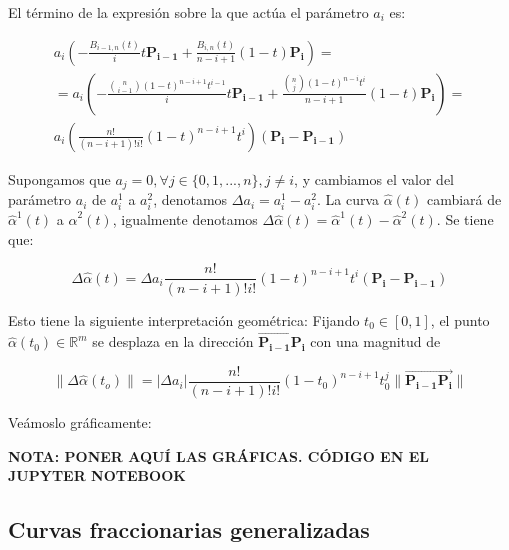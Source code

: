 \documentclass{article}
\newcommand{\R}{\mathbb{R}}
\begin{document}
El término de la expresión sobre la que actúa el parámetro $a_i$ es:

\begin{gather*}
a_i \left( -\frac{B_{i-1,n}(t)}{i} t \mathbf{P_{i-1}} + \frac{B_{i,n}(t)}{n-i+1} (1-t) \mathbf{P_i} \right) = \\
= a_i \left( -\frac{\binom{n}{i-1}(1-t)^{n-i+1} t^{i-1}}{i} t \mathbf{P_{i-1}} + \frac{\binom{n}{j}(1-t)^{n-i}t^i}{n-i+1} (1-t) \mathbf{P_i} \right) = \\
a_i \left( \frac{n!}{(n-i+1)!i!} (1-t)^{n-i+1} t^i  \right) \left( \mathbf{P_i} - \mathbf{P_{i-1}} \right)
\end{gather*}

Supongamos que $a_j = 0, \forall j\in\{0,1,...,n\}, j \neq i $, y cambiamos el valor del parámetro $a_i$ de $a_i^1$ a $a_i^2$, denotamos $\Delta a_i = a_i^1 - a_i^2$. La curva $\hat{\alpha}(t)$ cambiará de $\hat{\alpha}^1(t)$ a $\hat{\alpha}^2(t)$, igualmente denotamos $\Delta \hat{\alpha}(t) = \hat{\alpha}^1(t) - \hat{\alpha}^2(t)$. Se tiene que:

\begin{equation*}
\Delta \hat{\alpha}(t) = \Delta a_i \frac{n!}{(n-i+1)!i!}(1-t)^{n-i+1}t^i \left( \mathbf{P_i} - \mathbf{P_{i-1}} \right)
\end{equation*}

Esto tiene la siguiente interpretación geométrica: Fijando $t_0 \in [0,1]$, el punto $\hat{\alpha}(t_0) \in \R^m$ se desplaza en la dirección $\overrightarrow{\mathbf{P_{i-1}P_i}}$ con una magnitud de

\begin{equation*}
\lVert \Delta\hat{\alpha}(t_o) \rVert =  | \Delta a_i | \frac{n!}{(n-i+1)!i!}(1-t_0)^{n-i+1}t_0^j \lVert \overrightarrow{\mathbf{P_{i-1}P_i}} \rVert
\end{equation*}

Veámoslo gráficamente:

\textbf{NOTA: PONER AQUÍ LAS GRÁFICAS. CÓDIGO EN EL JUPYTER NOTEBOOK}





\subsection{Curvas fraccionarias generalizadas}
\end{document}
